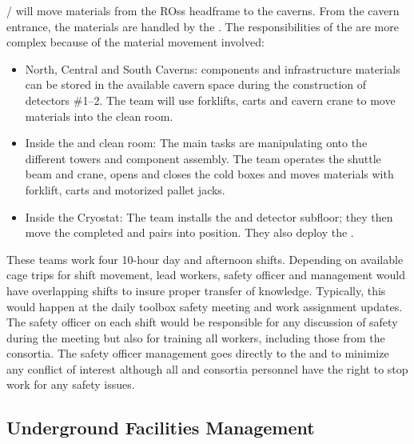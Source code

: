 \surf/ will move  materials from the
ROss headframe to the caverns. From the cavern entrance, the materials are
handled by the . The responsibilities of the  are
more complex because of the material movement involved:
\begin{itemize}
 \item North, Central and South Caverns:  components and
   infrastructure materials can be stored in the available cavern
   space during the construction of detectors \#1--2.  The  team will
   use forklifts, carts and cavern crane to move
   materials into the clean room.
 \item Inside the  and clean room: The main tasks are manipulating 
   onto the different  towers and  component
   assembly.  The team operates the shuttle beam and crane, opens and closes the
   cold boxes and moves materials with forklift, carts and motorized
   pallet jacks.
 \item Inside the Cryostat: The  team installs the  and detector
   subfloor; they then move the completed  and  pairs into
   position.  They also deploy the .
\end{itemize}

These teams work four 10-hour day and afternoon shifts.  Depending on
available cage trips for shift movement, lead workers,
safety officer and management would have overlapping shifts to insure 
proper transfer of knowledge.  Typically, this would happen at the daily
toolbox safety meeting and work assignment updates.  The safety
officer on each shift would be responsible for any discussion of safety
during the meeting but also for training all workers, including those from
the consortia. The safety officer management goes directly to the \surf
and   to minimize any conflict of interest although 
all  and consortia personnel have the right to stop
work for any safety issues.

\subsection{Underground Facilities Management}

